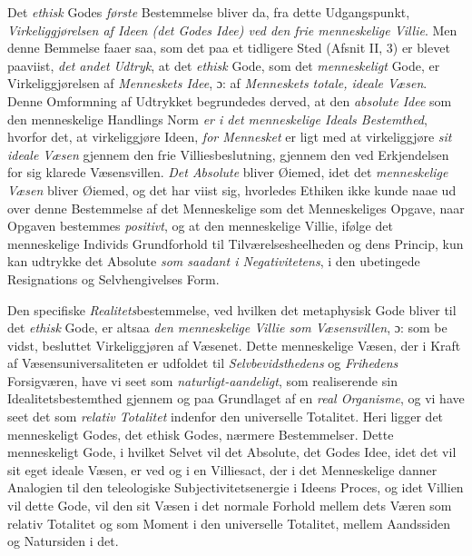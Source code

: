 Det \emph{ethisk} Godes \emph{første} Bestemmelse bliver da, fra dette
Udgangspunkt, \emph{Virkeliggjørelsen af Ideen (det Godes Idee) ved den frie
menneskelige Villie}. Men denne Bemmelse faaer saa, som det paa et tidligere
Sted (Afsnit II, 3) er blevet paaviist, \emph{det andet Udtryk}, at det
\emph{ethisk} Gode, som det \emph{menneskeligt} Gode, er Virkeliggjørelsen af
\emph{Menneskets Idee}, ɔ: af \emph{Menneskets totale, ideale Væsen}. Denne
Omformning af Udtrykket begrundedes derved, at den \emph{absolute Idee} som den
menneskelige Handlings Norm \emph{er i det menneskelige Ideals Bestemthed},
hvorfor det, at virkeliggjøre Ideen, \emph{for Mennesket} er ligt med at
virkeliggjøre \emph{sit ideale Væsen} gjennem den frie Villiesbeslutning,
gjennem den ved Erkjendelsen for sig klarede Væsensvillen. \emph{Det Absolute}
bliver Øiemed, idet det \emph{menneskelige Væsen} bliver Øiemed, og det har
viist sig, hvorledes Ethiken ikke kunde naae ud over denne Bestemmelse af det
Menneskelige som det Menneskeliges Opgave, naar Opgaven bestemmes
\emph{positivt}, og at den menneskelige Villie, ifølge det menneskelige Individs
Grundforhold til Tilværelsesheelheden og dens Princip, kun kan udtrykke det
Absolute \emph{som saadant i Negativitetens}, i den ubetingede Resignations og
Selvhengivelses Form.

Den specifiske \emph{Realitets}bestemmelse, ved hvilken det metaphysisk Gode
bliver til det \emph{ethisk} Gode, er altsaa \emph{den menneskelige Villie som
Væsensvillen}, ɔ: som be\-%
vidst, besluttet Virkeliggjøren af Væsenet. Dette menneskelige Væsen, der i
Kraft af Væsensuniversaliteten er udfoldet til \emph{Selvbevidsthedens} og
\emph{Frihedens} Forsigværen, have vi seet som \emph{naturligt-aandeligt}, som
realiserende sin Idealitetsbestemthed gjennem og paa Grundlaget af en \emph{real
Organisme}, og vi have seet det som \emph{relativ Totalitet} indenfor den
universelle Totalitet. Heri ligger det menneskeligt Godes, det ethisk Godes,
nærmere Bestemmelser. Dette menneskeligt Gode, i hvilket Selvet vil det Absolute,
det Godes Idee, idet det vil sit eget ideale Væsen, er ved og i en Villiesact,
der i det Menneskelige danner Analogien til den teleologiske
Subjectivitetsenergie i Ideens Proces, og idet Villien vil dette Gode, vil den
sit Væsen i det normale Forhold mellem dets Væren som relativ Totalitet og som
Moment i den universelle Totalitet, mellem Aandssiden og Natursiden i det.

